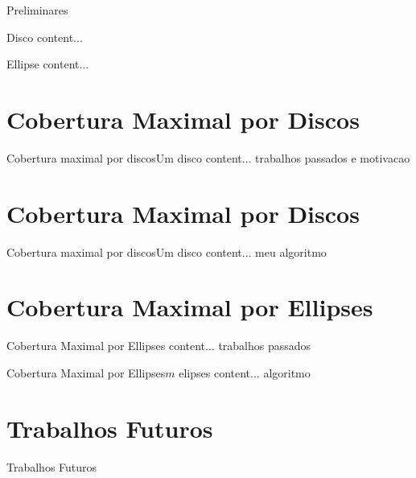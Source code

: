 \documentclass{beamer}
\begin{document}
\begin{frame}{Preliminares}
	\begin{block}{Disco}
		content...
	\end{block}

	\begin{block}{Ellipse}
		content...
	\end{block}
\end{frame}

\section{Cobertura Maximal por Discos}
\begin{frame}{Cobertura maximal por discos}{Um disco}
	content... trabalhos passados e motivacao
\end{frame}

\section{Cobertura Maximal por Discos}
\begin{frame}{Cobertura maximal por discos}{Um disco}
	content... meu algoritmo
\end{frame}


\section{Cobertura Maximal por Ellipses}

\begin{frame}{Cobertura Maximal por Ellipses}
	content... trabalhos passados
\end{frame}

\begin{frame}{Cobertura Maximal por Ellipses}{$m$ elipses}
	content... algoritmo
\end{frame}

\section{Trabalhos Futuros}

\begin{frame}{Trabalhos Futuros}

\end{frame}
\end{document}
